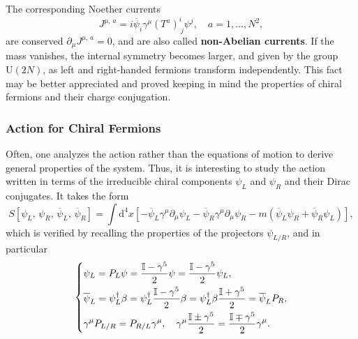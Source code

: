 The corresponding Noether currents
\[
    J^{\mu,\,a} = i \overline{\psi}_i \gamma^{\mu} (T^a)^i_{\ j} \psi^j, \quad a = 1, \ldots, N^2,
\]
are conserved \(\partial_\mu J^{\mu,\,a}=0\), and are also called \textbf{non-Abelian currents}. If the mass vanishes, the internal symmetry becomes larger, and given by the group \(\mathrm{U}(2N)\), as left and right-handed fermions transform independently. This fact may be better appreciated and proved keeping in mind the properties of chiral fermions and their charge conjugation.

\subsubsection{Action for Chiral Fermions}

Often, one analyzes the action rather than the equations of motion to derive general properties of the system. Thus, it is interesting to study the action written in terms of the irreducible chiral components \(\psi_L\) and \(\psi_R\) and their Dirac conjugates. It takes the form
\[
    S[\psi_L,\,\psi_R,\,\overline{\psi}_L,\,\overline{\psi}_R] = \int \mathrm{d}^4 x \left[- \overline{\psi}_L \gamma^{\mu} \partial_\mu \psi_L - \overline{\psi}_R \gamma^{\mu} \partial_\mu \psi_R - m (\overline{\psi}_L \psi_R + \overline{\psi}_R \psi_L) \right],
\]
which is verified by recalling the properties of the projectors \(\psi_{L/R} \), and in particular
\[
    \begin{dcases}
        \psi_L = P_L \psi = \frac{\mathbb{I} - \gamma^5}{2} \psi = \frac{\mathbb{I} - \gamma^5}{2} \psi_L,                                                                                    \\
        \overline{\psi}_L = \psi_L^{\dagger} \beta = \psi^{\dagger}_L \frac{\mathbb{I} - \gamma^5}{2} \beta = \psi^{\dagger}_L \beta \frac{\mathbb{I} + \gamma^5}{2} = \overline{\psi}_L P_R, \\
        \gamma^{\mu} P_{L/R} = P_{R/L} \gamma^{\mu}, \quad \gamma^{\mu} \frac{\mathbb{I} \pm \gamma^5}{2} = \frac{\mathbb{I} \mp \gamma^5}{2} \gamma^{\mu}.
    \end{dcases}
\]
